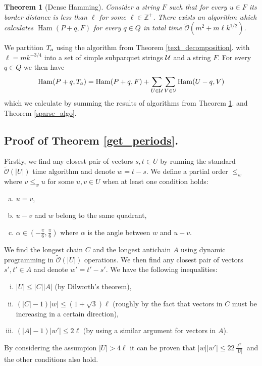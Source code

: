 \documentclass[11pt]{article}
\newcommand{\Z}{\mathbb{Z}}
\newcommand{\tO}{\tilde{\mathcal{O}}}
\DeclareMathOperator*{\Ham}{Ham}
\theoremstyle{plain}
\newtheorem{theorem}{Theorem}
\theoremstyle{definition}
\theoremstyle{remark}
\begin{document}
\begin{theorem}[Dense Hamming]
	\label{dense_algo}
	Consider a string $F$ such that for every $u \in F$ its border distance is less than $\ell$ for some $\ell \in \Z^+$.
	There exists an algorithm which calculates $\Ham(P + q, F)$ for every $q \in Q$ in total time $\tO(m^2 + m \ell k^{1/2})$.
\end{theorem}


We partition $T_a$ using the algorithm from Theorem \ref{text_decomposition}. with $\ell = mk^{-3/4}$ into a set of simple subparquet strings $\mathcal{U}$ and a string $F$.
For every $q \in Q$ we then have
$$ \Ham(P + q, \Ta) = \Ham(P + q, F) + \sum_{U \in \U}\sum_{V \in \V} \Ham(U - q, V) $$
which we calculate by summing the results of algorithms from Theorem \ref{dense_algo}. and Theorem \ref{sparse_algo}.


\subsection{Proof of Theorem \ref{get_periods}.}
Firstly, we find any closest pair of vectors $s, t \in U$ by running the standard $\tO(|U|)$ time algorithm and denote $w = t - s$.
We define a partial order $\le_{w}$ where $v \le_w u$ for some $u, v \in U$ when at least one condition holds:
\begin{enumerate}[(a)]
	\item $u = v$,
	\item $u - v$ and $w$ belong to the same quadrant,
	\item $\alpha \in (-\frac{\pi}{6}, \frac{\pi}{6})$ where $\alpha$ is the angle between $w$ and $u - v$.
\end{enumerate}
We find the longest chain $C$ and the longest antichain $A$ using dynamic programming in $\tO(|U|)$ operations.
We then find any closest pair of vectors $s', t' \in A$ and denote $w' = t' - s'$.
We have the following inequalities:
\begin{enumerate}[(i)]
	\item $|U| \le |C| |A|$ (by Dilworth's theorem),
	\item $(|C| - 1) |w| \le (1 + \sqrt{3})\ell$ (roughly by the fact that vectors in $C$ must be increasing in a certain direction), 
	\item $(|A| - 1) |w'| \le 2 \ell$ (by using a similar argument for vectors in $A$).
\end{enumerate}
By considering the assumpion $|U| > 4\ell$ it can be proven that $|w||w'| \le 22 \frac{\ell^2}{|U|}$ and the other conditions also hold.
\end{document}

